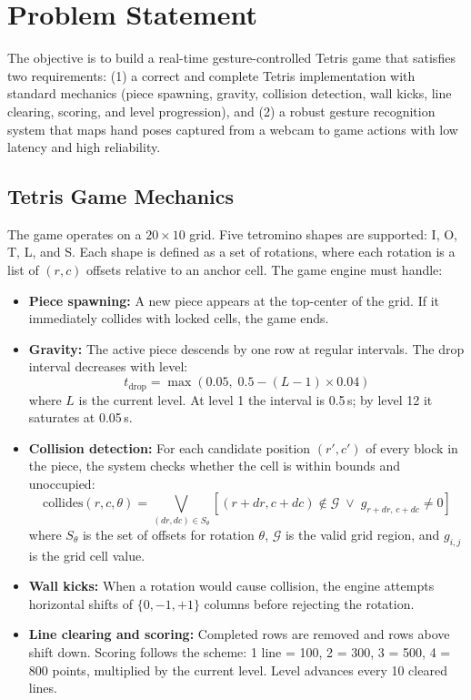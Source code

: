 \documentclass[conference]{IEEEtran}
\begin{document}
\section{Problem Statement}

The objective is to build a real-time gesture-controlled Tetris game that satisfies two requirements: (1) a correct and complete Tetris implementation with standard mechanics (piece spawning, gravity, collision detection, wall kicks, line clearing, scoring, and level progression), and (2) a robust gesture recognition system that maps hand poses captured from a webcam to game actions with low latency and high reliability.

\subsection{Tetris Game Mechanics}

The game operates on a $20 \times 10$ grid. Five tetromino shapes are supported: I, O, T, L, and S. Each shape is defined as a set of rotations, where each rotation is a list of $(r, c)$ offsets relative to an anchor cell. The game engine must handle:

\begin{itemize}
    \item \textbf{Piece spawning:} A new piece appears at the top-center of the grid. If it immediately collides with locked cells, the game ends.
    \item \textbf{Gravity:} The active piece descends by one row at regular intervals. The drop interval decreases with level:
    \begin{equation}
        t_{\text{drop}} = \max\!\left(0.05,\; 0.5 - (L - 1) \times 0.04\right)
        \label{eq:dropspeed}
    \end{equation}
    where $L$ is the current level. At level 1 the interval is 0.5\,s; by level 12 it saturates at 0.05\,s.
    \item \textbf{Collision detection:} For each candidate position $(r', c')$ of every block in the piece, the system checks whether the cell is within bounds and unoccupied:
    \begin{equation}
        \text{collides}(r, c, \theta) = \bigvee_{(dr, dc) \in S_\theta} \left[ (r{+}dr, c{+}dc) \notin \mathcal{G} \;\lor\; g_{r+dr,\, c+dc} \neq 0 \right]
        \label{eq:collision}
    \end{equation}
    where $S_\theta$ is the set of offsets for rotation $\theta$, $\mathcal{G}$ is the valid grid region, and $g_{i,j}$ is the grid cell value.
    \item \textbf{Wall kicks:} When a rotation would cause collision, the engine attempts horizontal shifts of $\{0, -1, +1\}$ columns before rejecting the rotation.
    \item \textbf{Line clearing and scoring:} Completed rows are removed and rows above shift down. Scoring follows the scheme: 1 line = 100, 2 = 300, 3 = 500, 4 = 800 points, multiplied by the current level. Level advances every 10 cleared lines.
\end{itemize}
\end{document}
